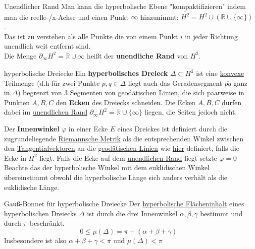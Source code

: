 \begin{titleDef}{Unendlicher Rand}
\label{unendlicherRand}
Man kann die hyperbolische Ebene "kompaktifizieren" indem man die reelle-/x-Achse und einen Punkt $\infty$ hinzunimmt: $\overline{H^2}=H^2\cup(\mathbb{R}\cup\{\infty\})$.\\
Das ist zu verstehen als alle Punkte die von einem Punkt $i$ in jeder Richtung unendlich weit entfernt sind.\\
Die Menge $\partial_\infty H^2=\mathbb{R}\cup\infty$ heißt der \textbf{unendliche Rand} von $H^2$.
\end{titleDef}

\begin{titleDef}{hyperbolische Dreiecke}
\label{hyperDreieck}
Ein \textbf{hyperbolisches Dreieck} $\Delta\subset\overline{H^2}$ ist eine \hyperref[konvexPoly]{konvexe} Teilmenge (d.h für zwei Punkte $p,q\in\Delta$ liegt auch das Geradensegment $\overline{pq}$ ganz in $\Delta$) begrenzt von 3 Segmenten von \hyperref[geodaetischPoincare]{geodätischen Linien}, die sich paarweise in Punkten $A,B,C$ den \textbf{Ecken} des Dreiecks schneiden. Die Ecken $A,B,C$ dürfen dabei im \hyperref[unendlicherRand]{unendlichen Rand} $\partial_\infty H^2=\mathbb{R}\cup\{\infty\}$ liegen, die Seiten jedoch nicht.\par
\label{hyperInnenwinkel}
Der \textbf{Innenwinkel} $\varphi$ in einer Ecke $E$ eines Dreickes ist definiert durch die zugrundeliegende \hyperref[riemannMetrik]{Riemannsche Metrik} als die entsprechenden Winkel zwischen den \hyperref[tangentialvektor]{Tangentialvektoren} an die \hyperref[geodaetischPoincare]{geodätischen Linien} wie \hyperref[kennwerteRiemann]{hier} definiert, falls die Ecke in $H^2$ liegt. Falls die Ecke auf dem \hyperref[unendlicherRand]{unendlichen Rand} liegt setzte $\varphi=0$\\
Beachte das der hyperbolische Winkel mit dem euklidischen Winkel übereinstimmt obwohl die hyperbolische Länge sich anders verhält als die euklidische Länge.
\end{titleDef}

\begin{titleDef}{Gauß-Bonnet für hyperbolische Dreiecke}
\label{gaussHyperDreieck}
Der \hyperref[hyperFlaeche]{hyperbolische Flächeninhalt} eines \hyperref[hyperDreieck]{hyperbolischen Dreiecks} $\Delta$ ist durch die drei Innenwinkel $\alpha,\beta,\gamma$ bestimmt und durch $\pi$ beschränkt.
$$0\leq\mu(\Delta)=\pi-(\alpha+\beta+\gamma)$$
Insbesondere ist also $\alpha+\beta+\gamma<\pi$ und $\mu(\Delta)<\pi$
\end{titleDef}